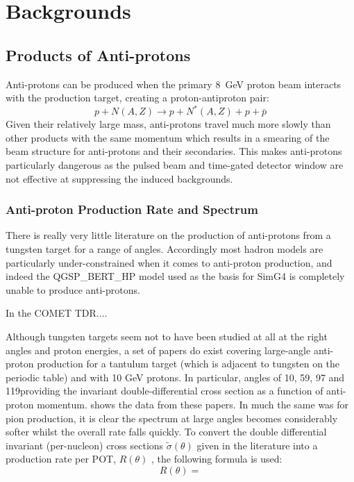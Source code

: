 \chapter{\phaseII Backgrounds}
\section{Products of Anti-protons}
Anti-protons can be produced when the primary 8~GeV proton beam interacts with the production target, creating a proton-antiproton pair:
\begin{equation}
p + N(A,Z) \rightarrow p + N^*(A,Z) + p+\bar{p}
\end{equation}
Given their relatively large mass, anti-protons travel much more slowly than other products with the same momentum which results in a smearing of the beam structure for anti-protons and their secondaries.
This makes anti-protons particularly dangerous as the pulsed beam and time-gated detector window are not effective at suppressing the induced backgrounds.

\subsection{Anti-proton Production Rate and Spectrum}
There is really very little literature on the production of anti-protons from a tungsten target for a range of angles.
Accordingly most hadron models are particularly under-constrained when it comes to anti-proton production, and indeed the QGSP_BERT_HP model used as the basis for SimG4 is completely unable to produce anti-protons.

In the COMET TDR....

Although tungsten targets seem not to have been studied at all at the right angles and proton energies, a set of papers do exist covering large-angle anti-proton production for a tantulum target (which is adjacent to tungsten on the periodic table) and with 10 GeV protons.
In particular, angles of 10, 59, 97 and 119\degree providing the invariant double-differential cross section as a function of anti-proton momentum.
 shows the data from these papers.  
In much the same was for pion production, it is clear the spectrum at large angles becomes considerably softer whilst the overall rate falls quickly.
To convert the double differential invariant (per-nucleon) cross sections $\tilde{\sigma}(\theta)$ given in the literature into a production rate per \ac{POT}, $R(\theta)$ , the following formula is used:
\begin{equation}
R(\theta)=
\end{equation}

